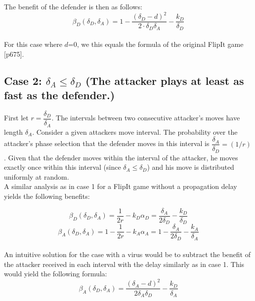  
 The benefit of the defender is then as follows:
\begin{equation}
\beta_{D}(\delta_{D},\delta_{A}) = 1 - \dfrac { (\delta_{D}-d) ^{2}} {2 \cdot \delta_{D}  \delta_{A}} - \dfrac{k_{D}}{ \delta_{D}}
\label{Benfcase1:defender}
\end{equation}
~~\\
For this case where $d$=0, we this equals the formula of the original FlipIt game \citep{FlipIt} [p675].\\





\subsection*{\textbf{Case 2:} $\delta_{A} \leq \delta_{D} $ (The attacker plays at least as fast as the defender.) }

First let $r = \dfrac{\delta_{D}}{ \delta_{A} }$. The intervals between two consecutive attacker's moves have length $\delta_{A}$. Consider a given attackers move interval. The probability over the attacker's phase selection that the defender moves in this interval is $\dfrac{\delta_{A}}{ \delta_{D} } = (1/r)$. Given that the defender moves within the interval of the attacker, he moves exactly once within this interval (since $\delta_{A} \leq \delta_{D} $) and his move is distributed uniformly at random. \\

A similar analysis as in case 1 for a FlipIt game without a propagation delay yields the following benefits:

\begin{equation*}
\beta_{D}(\delta_{D},\delta_{A}) = \dfrac {1} {2r} - k_{D} \alpha_{D} = \dfrac {\delta_{A}} {2\delta_{D}} - \dfrac{k_{D} }{\delta_{D}} 
\end{equation*}
\begin{equation*}
\beta_{A}(\delta_{D},\delta_{A}) =1 - \dfrac {1} {2r} - k_{A} \alpha_{A} = 1- \dfrac {\delta_{A}} {2\delta_{D}} - \dfrac{k_{A}}{ \delta_{A}}  
\end{equation*}\\

An intuitive solution for the case with a virus would be to subtract the benefit of the attacker received in each interval with the delay similarly as in case 1. This would yield the following formula:
\begin{equation*}
\beta_{A}(\delta_{D},\delta_{A})=\dfrac{(\delta_{A} - d)^2}{2\delta_{A}\delta_{D}} - \dfrac{k_{D}}{\delta_{A}}
\end{equation*}

